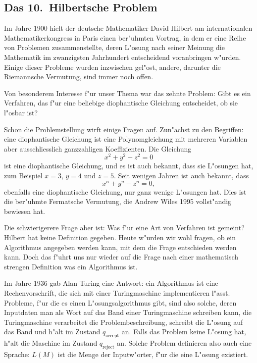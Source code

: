 \subsection{Das 10.~Hilbertsche Problem}
Im Jahre 1900 hielt der deutsche Mathematiker David Hilbert am
internationalen Mathematikerkongress in Paris einen ber"uhmten Vortrag,
in dem er eine Reihe von Problemen zusammenstellte, deren L"osung
nach seiner Meinung die Mathematik im zwanzigsten Jahrhundert
entscheidend voranbringen w"urden. Einige dieser Probleme wurden
inzwischen gel"ost, andere, darunter die Riemannsche Vermutung,
sind immer noch offen.

Von besonderem Interesse f"ur unser Thema war das zehnte Problem: 
Gibt es ein Verfahren, das f"ur eine beliebige diophantische Gleichung
entscheidet, ob sie l"osbar ist?

Schon die Problemstellung wirft einige Fragen auf.
Zun"achst zu den Begriffen:
eine diophantische Gleichung ist eine
Polynomgleichung mit mehreren Variablen aber ausschliesslich
ganzzahligen Koeffizienten. Die Gleichung 
\[
x^2+y^2-z^2=0
\]
ist eine diophantische Gleichung, und es ist auch bekannt, dass sie
L"osungen hat, zum Beispiel $x=3$, $y=4$ und $z=5$. Seit wenigen
Jahren ist auch bekannt, dass 
\[
x^n+y^n-z^n=0,
\]
ebenfalls eine diophantische Gleichung, nur ganz wenige L"osungen hat.
Dies ist die ber"uhmte Fermatsche Vermutung, die Andrew Wiles 1995
vollst"andig bewiesen hat.

Die schwierigerere Frage aber ist: Was f"ur eine Art von Verfahren
ist gemeint? Hilbert hat keine Definition gegeben. Heute w"urden
wir wohl fragen, ob ein Algorithmus angegeben werden kann, mit dem
die Frage entschieden werden kann. Doch das f"uhrt uns nur wieder
auf die Frage nach einer  mathematisch strengen Definition was
ein Algorithmus ist.

Im Jahre 1936 gab Alan Turing eine Antwort: ein Algorithmus ist eine
Rechenvorschrift, die sich mit einer Turingmaschine implementieren
l"asst. Probleme, f"ur die es einen L"osungsalgorithmus gibt, sind
also solche, deren Inputdaten man als Wort auf das Band einer
Turingmaschine schreiben kann, die Turingmaschine verarbeitet die
Problembeschreibung, schreibt die L"osung auf das Band und h"alt im
Zustand $q_{\text{accept}}$ an. Falls das Problem keine L"osung hat,
h"alt die Maschine im Zustand $q_{\text{reject}}$ an. Solche
Problem definieren also auch eine Sprache: $L(M)$ ist die
Menge der Inputw"orter, f"ur die eine L"osung existiert.

